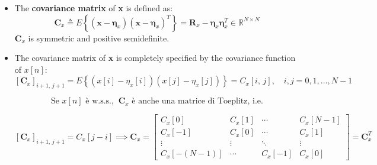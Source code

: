 \begin{itemize}
\[
\mathbf{R}_x =
\begin{bmatrix}
R_x[0] & R_x[1] & \cdots & R_x[N-1] \\
R_x[-1] & R_x[0] & \cdots & R_x[1] \\
\vdots & \vdots & \ddots & \vdots \\
R_x[-(N-1)] & \cdots & R_x[-1] & R_x[0]
\end{bmatrix}
= \mathbf{R}_x^T
\]
A \textbf{Toeplitz} matrix has a structure with some implications for the calculation of its inverse.
\item The \textbf{covariance matrix} of \textbf{x} is defined as:
\[
\mathbf{C}_x \triangleq E\left\{ (\mathbf{x} - \mathbf{\eta}_x)(\mathbf{x} - \mathbf{\eta}_x)^T \right\} = \mathbf{R}_x - \mathbf{\eta}_x \mathbf{\eta}_x^T \in \mathbb{R}^{N \times N}
\]
\(\mathbf{C}_x\) is symmetric and positive semidefinite.
\item The covariance matrix of \textbf{x} is completely specified by the covariance function of \(x[n]\):
\[
\left[ \mathbf{C}_x \right]_{i+1,\,j+1} = E\left\{ \left(x[i] - \eta_x[i]\right)\left(x[j] - \eta_x[j]\right) \right\} = C_x[i,\,j],\quad i, j = 0, 1, \ldots, N-1
\]

\[
\text{Se } x[n] \text{ è w.s.s.,} \;\; \mathbf{C}_x \text{ è anche una matrice di Toeplitz, i.e.}
\]

\[
\left[ \mathbf{C}_x \right]_{i+1,\,j+1} = C_x[j-i] \implies
\mathbf{C}_x =
\begin{bmatrix}
C_x[0] & C_x[1] & \cdots & C_x[N-1] \\
C_x[-1] & C_x[0] & \cdots & C_x[1] \\
\vdots & \vdots & \ddots & \vdots \\
C_x[-(N-1)] & \cdots & C_x[-1] & C_x[0]
\end{bmatrix}
= \mathbf{C}_x^T
\]
\end{itemize}
